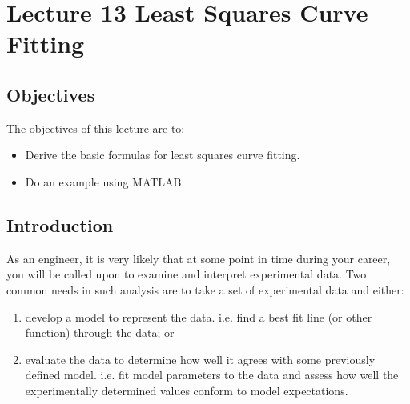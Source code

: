 \chapter{Lecture 13 Least Squares Curve Fitting}
\label{ch:lec13n}
\section{Objectives}
The objectives of this lecture are to:
\begin{itemize}
\item Derive the basic formulas for least squares curve fitting.
\item Do an example using MATLAB.
\end{itemize}
\setcounter{lstannotation}{0}

\section{Introduction}
As an engineer, it is very likely that at some point in time during your career,
you will be called upon to examine and interpret experimental data.  Two
common needs in such analysis are to take a set of experimental data and either:
\begin{enumerate}%
\item develop a model to represent the data. i.e. find a best fit line (or
  other function) through
  the data; or
\item evaluate the data to determine how well it agrees with some previously
  defined model.  i.e. fit model parameters to the data and assess how well
  the experimentally determined values conform to model expectations.

\end{enumerate}


